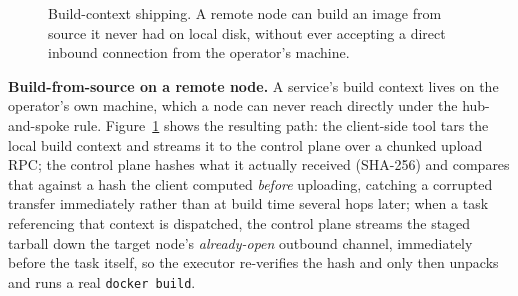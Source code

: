 \documentclass[conference]{IEEEtran}
\begin{document}
\begin{figure}[t]
\centering
{}
\caption{Build-context shipping. A remote node can build an image from source it never had on local
disk, without ever accepting a direct inbound connection from the operator's machine.}
\label{fig:docker-flow}
\end{figure}

\textbf{Build-from-source on a remote node.} A service's build context lives on the operator's own
machine, which a node can never reach directly under the hub-and-spoke rule. Figure~\ref{fig:docker-flow}
shows the resulting path: the client-side tool tars the local build context and streams it to the
control plane over a chunked upload RPC; the control plane hashes what it actually received (SHA-256)
and compares that against a hash the client computed \emph{before} uploading, catching a corrupted
transfer immediately rather than at build time several hops later; when a task referencing that
context is dispatched, the control plane streams the staged tarball down the target node's
\emph{already-open} outbound channel, immediately before the task itself, so the executor re-verifies
the hash and only then unpacks and runs a real \texttt{docker build}.
\end{document}
